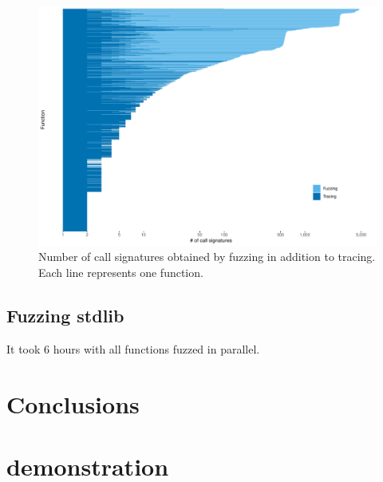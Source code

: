 \documentclass[sigplan,anonymous,review]{acmart}
\begin{document}





\begin{figure}
    \centering
    \includegraphics[width=\columnwidth]{code-and-figures/uf-call-signatures.pdf}
    \caption{
        Number of call signatures obtained by fuzzing in addition to tracing. Each line represents one function.
    }\label{fig:call-signatures}
\end{figure}

\subsection{Fuzzing stdlib}

%
It took 6 hours with all functions fuzzed in parallel.



\section{Conclusions}
\label{sec:conclusions}




\appendix

\section{\tool demonstration}\label{sec:demo}
\end{document}
